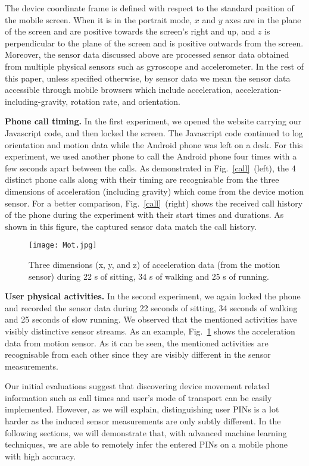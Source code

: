 \documentclass[10pt,twocolumn]{article}
\begin{document}
The device coordinate frame is defined with respect to the standard position of the mobile screen. When it is in the portrait mode, $x$ and $y$ axes are in the plane of the screen and are positive towards the screen's right and up, and $z$ is perpendicular to the plane of the screen and is positive outwards from the screen.  
Moreover, the sensor data discussed above are processed sensor data obtained from multiple physical sensors such as gyroscope and accelerometer. 
In the rest of this paper, unless specified otherwise, by sensor data we mean the sensor data accessible through mobile browsers which include acceleration, acceleration-including-gravity, rotation rate, and orientation.  

\textbf{Phone call timing.}
In the first experiment, we opened the website carrying our Javascript code, and then locked the screen. The Javascript code continued to log orientation and motion data while the Android phone was left on a desk. For this experiment, we used another phone to call the Android phone four times with a few seconds apart between the calls. As demonstrated in Fig.~\ref{call}~(left), the 4 distinct phone calls along with their timing are recognisable from the three dimensions of acceleration (including gravity) which come from the device motion sensor. 
For a better comparison, Fig.~\ref{call}~(right) shows the received call history of the phone during the experiment with their start times and durations. 
As shown in this figure, the captured sensor data match the call history. 

\begin{figure}[t]
	\centering
	\texttt{[image: Mot.jpg]}
	\caption{Three dimensions (x, y, and z) of acceleration data (from the motion sensor) during 22 s of sitting, 34 s of walking and 25 s of running.} 
	\label{sitting}
\end{figure}
\textbf{User physical activities.}
In the second experiment, we again locked the phone and recorded the sensor data during 22 seconds of sitting, 34 seconds of walking and 25 seconds of slow running. We observed that the mentioned activities have visibly distinctive sensor streams. As an example, Fig.~\ref{sitting} shows the acceleration data from motion sensor. As it can be seen, the mentioned activities are recognisable from each other since they are visibly different in the sensor measurements.  

Our initial evaluations suggest that discovering device movement related information such as call times and user's mode of transport can be easily implemented. 
However, as we will explain, distinguishing user PINs is a lot harder as the induced sensor measurements are only subtly different. In the following sections, we will demonstrate that, with advanced machine learning techniques, we are able to remotely infer the entered PINs on a mobile phone with high accuracy.
\end{document}
